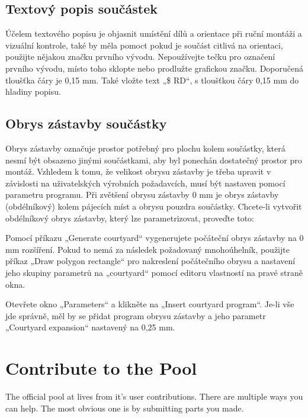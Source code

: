 \documentclass[letterpaper,10pt,czech]{sphinxmanual}
\begin{document}
\section{Textový popis součástek}
\label{\detokenize{create-package:textovy-popis-soucastek}}
Účelem textového popisu je objasnit umístění dílů a orientace při ruční montáži a vizuální kontrole, také by měla pomoct pokud je součást citlivá na orientaci, použijte nějakou značku prvního vývodu. Nepoužívejte tečku pro označení prvního vývodu, místo toho sklopte nebo prodlužte grafickou značku. Doporučená tloušťka čáry je 0,15 mm. Také vložte text „\$ RD“, s tloušťkou čáry 0,15 mm do hladiny popisu.


\section{Obrys zástavby součástky}
\label{\detokenize{create-package:obrys-zastavby-soucastky}}
Obrys zástavby označuje prostor potřebný pro plochu kolem součástky, která nesmí být obsazeno jinými součástkami, aby byl ponechán dostatečný prostor pro montáž. Vzhledem k tomu, že velikost obrysu zástavby je třeba upravit v závislosti na uživatelských výrobních požadavcích, musí být nastaven pomocí parametru
programu. Při zvětšení obrysu zástavby 0 mm je obrys zástavby (obdélníkový) kolem pájecích míst a obrysu pouzdra součástky. Chcete-li vytvořit obdélníkový obrys zástavby, který lze parametrizovat, proveďte toto:

Pomocí příkazu „Generate courtyard“ vygenerujete počáteční obrys zástavby na
0 mm rozšíření. Pokud to nemá za následek požadovaný mnohoúhelník, použijte
příkaz „Draw polygon rectangle“ pro nakreslení počátečního obrysu a nastavení
jeho skupiny parametrů na „courtyard“ pomocí editoru vlastností na
pravé straně okna.

Otevřete okno „Parameters“ a klikněte na „Insert courtyard program“. Je-li
vše jde správně, měl by se přidat program obrysu zástavby a jeho
parametr „Courtyard expansion“ nastavený na 0,25 mm.


\chapter{Contribute to the Pool}
\label{\detokenize{pool-contribute:contribute-to-the-pool}}\label{\detokenize{pool-contribute::doc}}
The official pool at  lives from it’s user
contributions. There are multiple ways you can help. The most obvious one is
by submitting parts you made.
\end{document}
